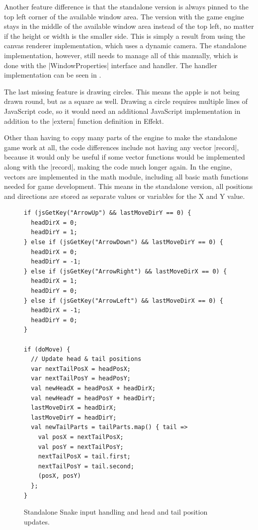 Another feature difference is that the standalone version is always pinned to the top left corner of the available window area. The version with the game engine stays in the middle of the available window area instead of the top left, no matter if the height or width is the smaller side. This is simply a result from using the canvas renderer implementation, which uses a dynamic camera. The standalone implementation, however, still needs to manage all of this manually, which is done with the |WindowProperties| interface and handler. The handler implementation can be seen in .

The last missing feature is drawing circles. This means the apple is not being drawn round, but as a square as well. Drawing a circle requires multiple lines of JavaScript code, so it would need an additional JavaScript implementation in addition to the |extern| function definition in Effekt.

Other than having to copy many parts of the engine to make the standalone game work at all, the code differences include not having any vector |record|, because it would only be useful if some vector functions would be implemented along with the |record|, making the code much longer again. In the engine, vectors are implemented in the math module, including all basic math functions needed for game development. This means in the standalone version, all positions and directions are stored as separate values or variables for the X and Y value.

\begin{figure}[h!]
\begin{lstlisting}
if (jsGetKey("ArrowUp") && lastMoveDirY == 0) {
  headDirX = 0;
  headDirY = 1;
} else if (jsGetKey("ArrowDown") && lastMoveDirY == 0) {
  headDirX = 0;
  headDirY = -1;
} else if (jsGetKey("ArrowRight") && lastMoveDirX == 0) {
  headDirX = 1;
  headDirY = 0;
} else if (jsGetKey("ArrowLeft") && lastMoveDirX == 0) {
  headDirX = -1;
  headDirY = 0;
}

if (doMove) {
  // Update head & tail positions
  var nextTailPosX = headPosX;
  var nextTailPosY = headPosY;
  val newHeadX = headPosX + headDirX;
  val newHeadY = headPosY + headDirY;
  lastMoveDirX = headDirX;
  lastMoveDirY = headDirY;
  val newTailParts = tailParts.map() { tail =>
    val posX = nextTailPosX;
    val posY = nextTailPosY;
    nextTailPosX = tail.first;
    nextTailPosY = tail.second;
    (posX, posY)
  };
}
\end{lstlisting}
\caption{Standalone Snake input handling and head and tail position updates.}
\label{fig:casestandalonepos}
\end{figure}

